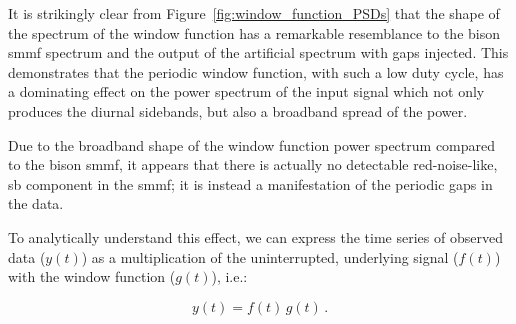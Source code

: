 
It is strikingly clear from Figure~\ref{fig:window_function_PSDs} that the shape of the spectrum of the window function has a remarkable resemblance to the \gls{bison} \gls{smmf} spectrum and the output of the artificial spectrum with gaps injected. This demonstrates that the periodic window function, with such a low duty cycle, has a dominating effect on the power spectrum of the input signal which not only produces the diurnal sidebands, but also a broadband spread of the power.

Due to the broadband shape of the window function power spectrum compared to the \gls{bison} \gls{smmf}, it appears that there is actually no detectable red-noise-like, \gls{sb} component in the \gls{smmf}; it is instead a manifestation of the periodic gaps in the data. %

To analytically understand this effect, we can express the time series of observed data ($y(t)$) as a multiplication of the uninterrupted, underlying signal ($f(t)$) with the window function ($g(t)$), i.e.:

\begin{equation}
y(t)  = f(t) \, g(t)
\label{eq:timeseries} \, .
\end{equation}

